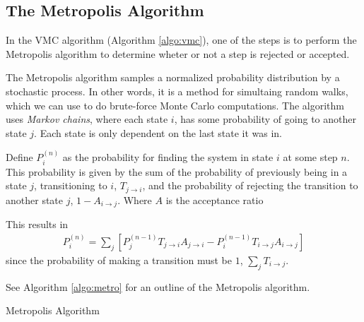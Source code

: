 \documentclass[twocolumns, a4paper,11pt,fleqn]{extarticle}
\newcommand{\eq}[1]{{\small\begin{align*}#1\end{align*}}}
\begin{document}
\subsection{The Metropolis Algorithm}
In the VMC algorithm (Algorithm \ref{algo:vmc}),
one of the steps is to perform the Metropolis algorithm to determine wheter or not
a step is rejected or accepted.

The Metropolis algorithm samples a normalized probability distribution
by a stochastic process. In other words, it is a method for simultaing
random walks, which we can use to do brute-force Monte Carlo computations.
The algorithm uses \textit{Markov chains}, where each state $i$,
has some probability of going to another state $j$.
Each state is only dependent on the last state it was in.

Define $P^{(n)}_i$ as the probability for finding the system in state $i$
at some step $n$. This probability is given by the sum of the probability of
previously being in a state $j$, transitioning to $i$, $T_{j\rightarrow i}$,
and the probability of rejecting the transition to another state $j$,
$1-A_{i\rightarrow j}$.
Where $A$ is the acceptance ratio

This results in
\eq{
  P_{i}^{(n)} = 
  \sum_j \left[
  P_{j}^{(n-1)} T_{j\rightarrow i} A_{j\rightarrow i}-
  P_{i}^{(n-1)} T_{i\rightarrow j} A_{i\rightarrow j}
  \right]
}
since the probability of making a transition must be $1$, $\sum_j T_{i\rightarrow j}$.


See Algorithm \ref{algo:metro} for an outline of the Metropolis algorithm.

\begin{algorithm}[H]
	\caption{Metropolis Algorithm}\label{algo:metro}
  \begin{algorithmic}[1]
    \EndProcedure
  \end{algorithmic}
\end{algorithm}
\end{document}

